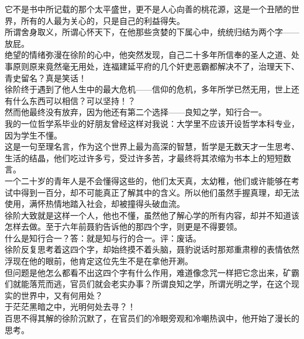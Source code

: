 \begin{multicols}{\theparacolNo}
它不是书中所记载的那个太平盛世，更不是人心向善的桃花源，这是一个丑陋的世界，所有的人最为关心的，只是自己的利益得失。\\

所谓舍身取义，所谓心怀天下，在他那些贪婪的下属心中，统统归结为两个字——放屁。\\

绝望的情绪弥漫在徐阶的心中，他突然发现，自己二十多年所信奉的圣人之道、处事原则原来竟然毫无用处，连福建延平府的几个奸吏恶霸都解决不了，治理天下、青史留名？真是笑话！\\

徐阶终于遇到了他人生中的最大危机——信仰的危机，多年所学已然无用，世上还有什么东西可以相信？可以坚持！？\\

然而他最终没有放弃，因为他还有第二个选择——良知之学，知行合一。\\

我的一位哲学系毕业的好朋友曾经这样对我说：大学里不应该开设哲学本科专业，因为学生不懂。\\

这是一句至理名言，作为这个世界上最为高深的智慧，哲学是无数天才一生思考、生活的结晶，他们吃过许多亏，受过许多苦，才最终将其浓缩为书本上的短短数言。\\

一个二十岁的青年人是不会懂得这些的，他们太天真，太幼稚，他们或许能够在考试中得到一百分，却不可能真正了解其中的含义。所以他们虽然手握真理，却无法使用，满怀热情地踏入社会，却被撞得头破血流。\\

徐阶大致就是这样一个人，他也不懂，虽然他了解心学的所有内容，却并不知道该怎样去做。至于六年前聂豹告诉他的那四个字，则更是不得要领。\\

什么是知行合一？答：就是知与行的合一。评：废话。\\

徐阶反复思考着这四个字，却始终摸不着头脑，聂豹说话时那郑重肃穆的表情依然浮现在他的眼前，他肯定这位先生不是在拿他开涮。\\

但问题是他怎么都看不出这四个字有什么作用，难道像念咒一样把它念出来，矿霸们就能落荒而逃，官员们就会老实办事？所谓良知之学，所谓光明之学，在这个现实的世界中，又有何用处？\\

于茫茫黑暗之中，光明何处去寻？！\\

百思不得其解的徐阶沉默了，在官员们的冷眼旁观和冷嘲热讽中，他开始了漫长的思考。\\


\end{multicols}
